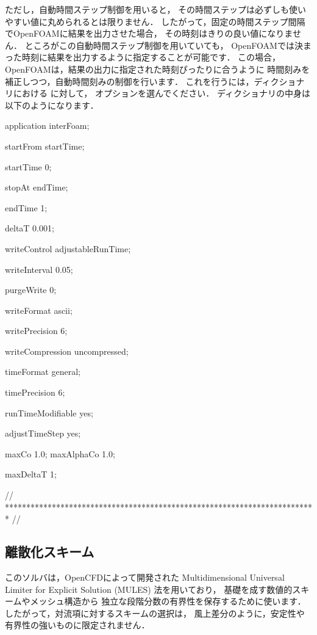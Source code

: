 ただし，自動時間ステップ制御を用いると，
その時間ステップは必ずしも使いやすい値に丸められるとは限りません．
したがって，固定の時間ステップ間隔でOpenFOAMに結果を出力させた場合，
その時刻はきりの良い値になりません．
ところがこの自動時間ステップ制御を用いていても，
OpenFOAMでは決まった時刻に結果を出力するように指定することが可能です．
この場合，OpenFOAMは，結果の出力に指定された時刻ぴったりに合うように
時間刻みを補正しつつ，自動時間刻みの制御を行います．
これを行うには，ディクショナリにおける
%
%
に対して，
%
%
オプションを選んでください．
%
%
ディクショナリの中身は以下のようになります．
\begin{OFverbatim}[file, linenum=17]

application     interFoam;

startFrom       startTime;

startTime       0;

stopAt          endTime;

endTime         1;

deltaT          0.001;

writeControl    adjustableRunTime;

writeInterval   0.05;

purgeWrite      0;

writeFormat     ascii;

writePrecision  6;

writeCompression uncompressed;

timeFormat      general;

timePrecision   6;

runTimeModifiable yes;

adjustTimeStep  yes;

maxCo           1.0;
maxAlphaCo      1.0;

maxDeltaT       1;


// ************************************************************************* //
\end{OFverbatim}


\subsection{離散化スキーム}
\label{ssec:2.3.6}
このソルバは，OpenCFDによって開発された
Multidimensional Universal Limiter for Explicit Solution (MULES) 法を用いており，
基礎を成す数値的スキームやメッシュ構造から
独立な段階分数の有界性を保存するために使います．
したがって，対流項に対するスキームの選択は，
風上差分のように，安定性や有界性の強いものに限定されません．

